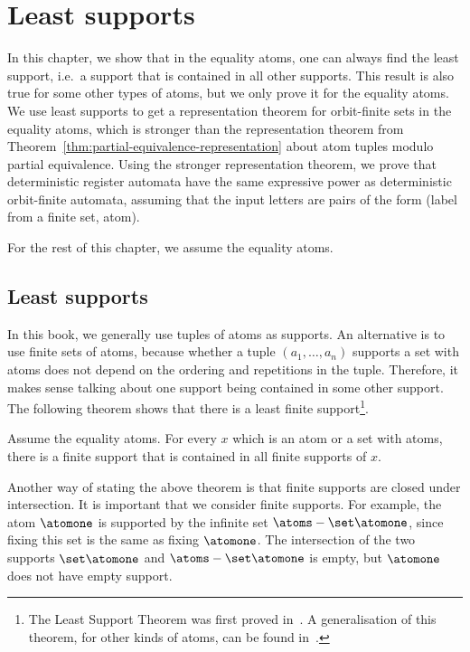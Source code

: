 \chapter{Least supports}
\label{sec:least-supports}
In this chapter, we show that in the equality atoms, one can always find the least support, i.e.~a support that is contained in all other supports. This result is also true for some other types of atoms, but we only prove it for the equality atoms. We use least supports to get a representation theorem for orbit-finite sets in the equality atoms, which is stronger than the representation theorem from Theorem~\ref{thm:partial-equivalence-representation} about atom tuples modulo partial equivalence. Using the stronger representation theorem, we prove that deterministic register automata have the same expressive power as deterministic orbit-finite automata, assuming that the input letters are pairs of the form (label from a finite set, atom).

For the rest of this chapter, we assume the equality atoms. 
\section{Least supports}
In this book, we generally use tuples of atoms as supports. An alternative is to use finite sets of atoms, because whether a tuple $(a_1,\ldots,a_n)$ supports a set with atoms does not depend on the ordering and repetitions in the tuple. Therefore, it makes sense talking about one support being contained in some other support. 
The following theorem shows that there is a least finite support\footnote{The Least Support Theorem was first proved in~\cite[Proposition 3.4]{DBLP:journals/fac/GabbayP02}. A generalisation of this theorem, for other kinds of atoms, can be found in~\cite[Section 10]{DBLP:journals/corr/BojanczykKL14}.}. 
\begin{theorem} \label{thm:least-supports}
	Assume the equality atoms. For every $x$ which is an atom or a set with atoms, there is a finite support that is contained in all finite supports of $x$.
\end{theorem}

Another way of stating the above theorem is that finite supports are closed under intersection. 
 It is important that we consider finite supports. For example, the atom $\atomone$ is supported by the infinite set $\atoms - \set \atomone$, since fixing this set is the same as fixing $\atomone$. The intersection of the two supports $\set \atomone$ and $\atoms - \set \atomone$ is empty, but $\atomone$ does not have empty support. 

